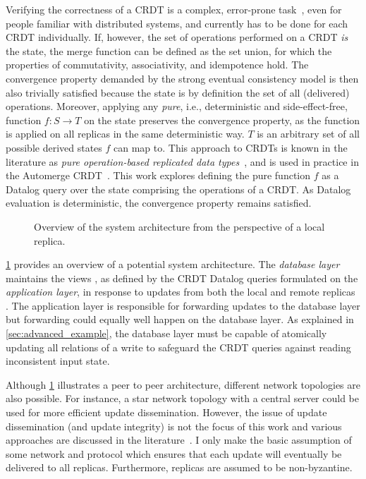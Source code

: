 Verifying the correctness of a \ac{CRDT} is a complex,
error-prone task~\cite{gomes2017verifying, kleppmann2022assessing},
even for people familiar with distributed systems,
and currently has to be done for each \ac{CRDT} individually.
If, however, the set of operations performed on a \ac{CRDT} \emph{is} the state,
the merge function can be defined as the set union,
for which the properties of commutativity, associativity, and idempotence hold.
The convergence property demanded by the strong eventual consistency
model is then also trivially satisfied because the state is by definition
the set of all (delivered) operations.
Moreover, applying any \emph{pure}, i.e., deterministic and side-effect-free,
function \( f: S \to T \) on the state preserves the convergence property,
as the function is applied on all replicas in the same deterministic way.
\( T \) is an arbitrary set of all possible derived states \( f \) can map to.
This approach to \acp{CRDT} is known in the literature as
\emph{pure operation-based replicated data types}~\cite{baquero2017pure, stewen2024undo},
and is used in practice in the Automerge \ac{CRDT}~\cite{automerge}.
This work explores defining the pure function \( f \) as a Datalog query
over the state comprising the operations of a \ac{CRDT}.
As Datalog evaluation is deterministic, the convergence property remains satisfied.

\begin{figure}
    \centering
    
    \caption{
        Overview of the system architecture from the perspective of a local
        replica.
    }\label{fig:system-arch}
\end{figure}

\ref{fig:system-arch} provides an overview of a potential system architecture.
The \emph{database layer} maintains the views \deltaO{},
as defined by the \ac{CRDT} Datalog queries formulated on the \emph{application layer},
in response to updates from both the local  and remote replicas
.
The application layer is responsible for forwarding updates to the database layer
but forwarding could equally well happen on the database layer.
As explained in \ref{sec:advanced_example}, the database layer must be capable
of atomically updating all relations of a write to safeguard the \ac{CRDT} queries
against reading inconsistent input state.

Although \ref{fig:system-arch} illustrates a peer to peer architecture,
different network topologies are also possible.
For instance, a star network topology with a central server could be used
for more efficient update dissemination.
However, the issue of update dissemination (and update integrity) is not the focus
of this work and various approaches are discussed in the
literature~\cite{auvolat2019merkle,sanjuan2020merkle,kleppmann2024bluesky,bftcrdts}.
I only make the basic assumption of some network and protocol
which ensures that each update will eventually be delivered to all replicas.
Furthermore, replicas are assumed to be non-byzantine.

